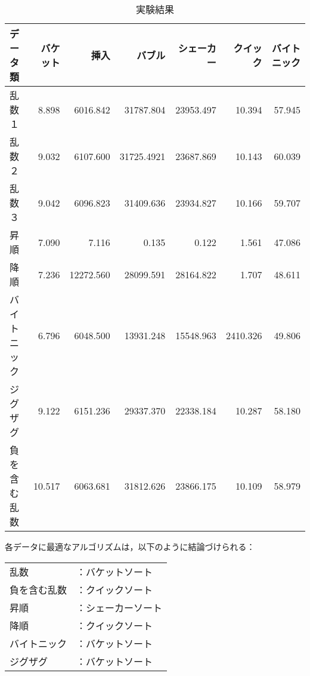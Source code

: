 \documentclass[a4j, titlepage]{jarticle}
\begin{document}
    \begin{table}[h!]
        \caption{実験結果}
        \label{tab:result}
        \begin{flushleft}
            \begin{tabular}{|l|r|r|r|r|r|r|}
                \hline
                データ類   & バケット & 挿入 & バブル & シェーカー & クイック & バイトニック \\ \hline
                乱数１     & \cellcolor{green!20}8.898 & 6016.842 & 31787.804 & 23953.497 & 10.394 & 57.945 \\ \hline
                乱数２     & \cellcolor{green!20}9.032 & 6107.600 & 31725.4921 & 23687.869 & 10.143 & 60.039 \\ \hline
                乱数３     & \cellcolor{green!20}9.042 & 6096.823 & 31409.636 & 23934.827 & 10.166 & 59.707 \\ \hline
                昇順       & 7.090 & 7.116 & 0.135 &  \cellcolor{green!20}0.122 & 1.561 & 47.086 \\ \hline
                降順       & 7.236 & 12272.560 & 28099.591 & 28164.822 &  \cellcolor{green!20}1.707 & 48.611 \\ \hline
                バイトニック& \cellcolor{green!20}6.796 & 6048.500 & 13931.248 & 15548.963 & 2410.326 & 49.806 \\ \hline
                ジグザグ   &  \cellcolor{green!20}9.122 & 6151.236 & 29337.370 & 22338.184 & 10.287 & 58.180 \\ \hline
                負を含む乱数& 10.517 & 6063.681 & 31812.626 & 23866.175 &  \cellcolor{green!20}10.109 & 58.979 \\ \hline
            \end{tabular}
        \end{flushleft}
    \end{table}

    \vspace{170pt}
    
    各データに最適なアルゴリズムは，以下のように結論づけられる：
    \begin{shadebox}
        \begin{tabular}{ll}
            乱数 &：バケットソート\\
            負を含む乱数 &：クイックソート\\
            昇順 &：シェーカーソート\\
            降順 &：クイックソート\\
            バイトニック &：バケットソート\\
            ジグザグ &：バケットソート\\
        \end{tabular}
    \end{shadebox}
    
\end{document}
